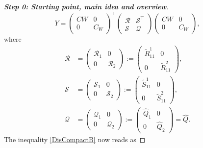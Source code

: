 \documentclass[11pt,a4paper,oneside,DIV=12,headings=small]{scrartcl}
\newcommand{\cS}{\mathcal{S}}
\newcommand{\cQ}{\mathcal{Q}}
\newcommand{\cR}{\mathcal{R}}
\theoremstyle{plain}
\begin{document}
\begin{proof}[\textbf{Step 0: \emph{Starting point, main idea and overview}}]
\begin{equation}
Y=\begin{pmatrix} C W & 0 \\ 0 & C_W \end{pmatrix}^\top
\begin{pmatrix} \cR & \cS^\top \\ \cS & \cQ \end{pmatrix}
\begin{pmatrix} C W & 0 \\ 0 & C_W \end{pmatrix}, 
\end{equation}
where
\begin{subequations}
\label{cc}
\begin{align}
\cR&=
\begin{pmatrix} \cR_1 & 0 \\ 0 & \cR_2 \end{pmatrix}:=
\begin{pmatrix} \tilde{R}^1_{11} & 0 \\ 0 & \tilde{R}^2_{11} \end{pmatrix}, \label{ccA} \\
\cS&=
\begin{pmatrix} \cS_1 & 0 \\ 0 & \cS_2 \end{pmatrix}:=
\begin{pmatrix} \tilde{S}^1_{11} & 0 \\ 0 & \tilde{S}^2_{11} \end{pmatrix}, \label{ccB}\\
\cQ&=
\begin{pmatrix} \cQ_1 & 0 \\ 0 & \cQ_2 \end{pmatrix}:=
\begin{pmatrix} \hat{Q}_1 & 0 \\ 0 & \hat{Q}_2 \end{pmatrix}=\hat{Q}. \label{ccC}
\end{align}
\end{subequations}
The inequality \eqref{DisCompactB} now reads as


\end{proof}
\end{document}

